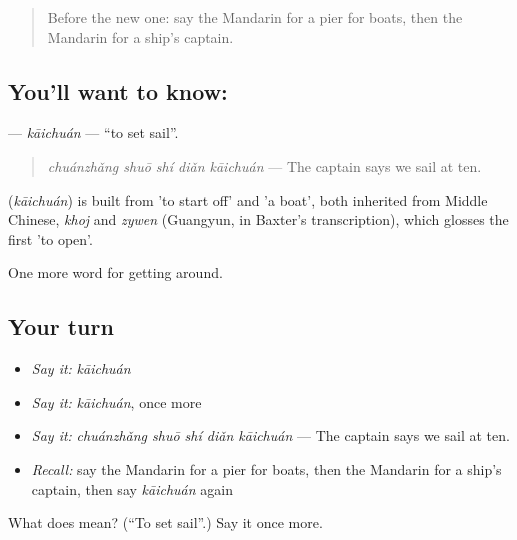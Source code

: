\label{lesson:ZH-C411-kaichuan}



\begin{quote}
Before the new one: say the Mandarin for a pier for boats, then the Mandarin for a ship's captain.
\end{quote}

\subsection*{You'll want to know: }
\textbf{} — \emph{kāichuán} — \textquotedblleft{}to set sail\textquotedblright{}.

\begin{quote}
\textbf{} \emph{chuánzhǎng shuō shí diǎn kāichuán} — The captain says we sail at ten.
\end{quote}

\begin{cousinweb}
\textbf{} (\emph{kāichuán}) is built from  'to start off' and  'a boat', both inherited from Middle Chinese, \emph{khoj} and \emph{zywen} (Guangyun, in Baxter's transcription), which glosses the first 'to open'.
\end{cousinweb}

\begin{grammarlens}[title={What you've built}]
One more word for getting around.
\end{grammarlens}

\subsection*{Your turn}
\begin{itemize}
\raggedright
  \item \emph{Say it:} \emph{kāichuán}
  \item \emph{Say it:} \emph{kāichuán}, once more
  \item \emph{Say it:} \emph{chuánzhǎng shuō shí diǎn kāichuán} — The captain says we sail at ten.
  \item \emph{Recall:} say the Mandarin for a pier for boats, then the Mandarin for a ship's captain, then say \emph{kāichuán} again
\end{itemize}

\begin{tcolorbox}[breakable,colback=teal!4,colframe=teal!35!black,title={Before you move on}]
What does  mean? (\textquotedblleft{}To set sail\textquotedblright{}.) Say it once more.
\end{tcolorbox}
